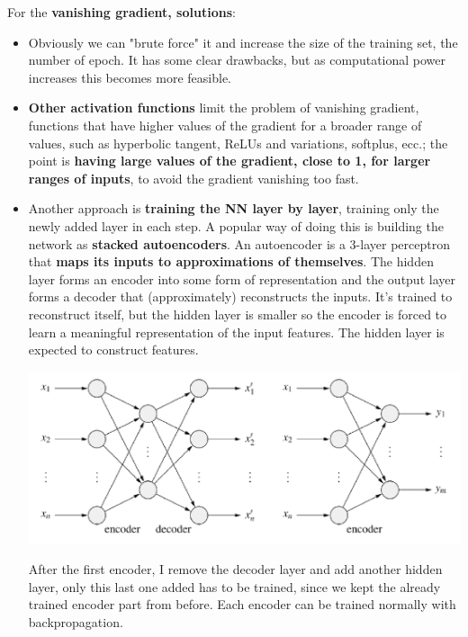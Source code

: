 For the \textbf{vanishing gradient, solutions}:
\begin{itemize}
	\item Obviously we can "brute force" it and increase the size of the training set, the number of epoch. It has some clear drawbacks, but as computational power increases this becomes more feasible.\\
	
	\item \textbf{Other activation functions} limit the problem of vanishing gradient, functions that have higher values of the gradient for a broader range of values, such as hyperbolic tangent, ReLUs and variations, softplus, ecc.; the point is \textbf{having large values of the gradient, close to 1, for larger ranges of inputs}, to avoid the gradient vanishing too fast.\\
	
	\item Another approach is \textbf{training the NN layer by layer}, training only the newly added layer in each step. A popular way of doing this is building the network as \textbf{stacked autoencoders}. An autoencoder is a 3-layer perceptron that \textbf{maps its inputs to approximations of themselves}. The hidden layer forms an encoder into some form of representation and the output layer forms a decoder that (approximately) reconstructs the inputs. It's trained to reconstruct itself, but the hidden layer is smaller so the encoder is forced to learn a meaningful representation of the input features. The hidden layer is expected to construct features.
	\begin{center}
		\includegraphics[width=0.9\columnwidth]{img/NN/autoencoder}
	\end{center}
	After the first encoder, I remove the decoder layer and add another hidden layer, only this last one added has to be trained, since we kept the already trained encoder part from before. Each encoder can be trained normally with backpropagation.\\
	

\end{itemize}
